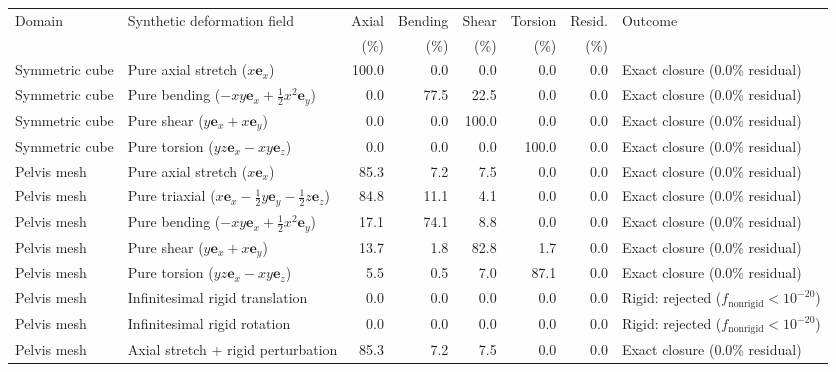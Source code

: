 \begin{tabular}{llrrrrrl}
\toprule
Domain & Synthetic deformation field & Axial & Bending & Shear & Torsion & Resid. & Outcome \\
 & & (\%) & (\%) & (\%) & (\%) & (\%) & \\
\midrule
Symmetric cube & Pure axial stretch ($x\mathbf{e}_x$) & 100.0 & 0.0 & 0.0 & 0.0 & 0.0 & Exact closure (0.0\% residual) \\
Symmetric cube & Pure bending ($-xy\mathbf{e}_x + \frac{1}{2}x^2\mathbf{e}_y$) & 0.0 & 77.5 & 22.5 & 0.0 & 0.0 & Exact closure (0.0\% residual) \\
Symmetric cube & Pure shear ($y\mathbf{e}_x + x\mathbf{e}_y$) & 0.0 & 0.0 & 100.0 & 0.0 & 0.0 & Exact closure (0.0\% residual) \\
Symmetric cube & Pure torsion ($yz\mathbf{e}_x - xy\mathbf{e}_z$) & 0.0 & 0.0 & 0.0 & 100.0 & 0.0 & Exact closure (0.0\% residual) \\
\midrule
Pelvis mesh & Pure axial stretch ($x\mathbf{e}_x$) & 85.3 & 7.2 & 7.5 & 0.0 & 0.0 & Exact closure (0.0\% residual) \\
Pelvis mesh & Pure triaxial ($x\mathbf{e}_x - \frac{1}{2}y\mathbf{e}_y - \frac{1}{2}z\mathbf{e}_z$) & 84.8 & 11.1 & 4.1 & 0.0 & 0.0 & Exact closure (0.0\% residual) \\
Pelvis mesh & Pure bending ($-xy\mathbf{e}_x + \frac{1}{2}x^2\mathbf{e}_y$) & 17.1 & 74.1 & 8.8 & 0.0 & 0.0 & Exact closure (0.0\% residual) \\
Pelvis mesh & Pure shear ($y\mathbf{e}_x + x\mathbf{e}_y$) & 13.7 & 1.8 & 82.8 & 1.7 & 0.0 & Exact closure (0.0\% residual) \\
Pelvis mesh & Pure torsion ($yz\mathbf{e}_x - xy\mathbf{e}_z$) & 5.5 & 0.5 & 7.0 & 87.1 & 0.0 & Exact closure (0.0\% residual) \\
Pelvis mesh & Infinitesimal rigid translation & 0.0 & 0.0 & 0.0 & 0.0 & 0.0 & Rigid: rejected ($f_{\mathrm{nonrigid}} < 10^{-20}$) \\
Pelvis mesh & Infinitesimal rigid rotation & 0.0 & 0.0 & 0.0 & 0.0 & 0.0 & Rigid: rejected ($f_{\mathrm{nonrigid}} < 10^{-20}$) \\
Pelvis mesh & Axial stretch + rigid perturbation & 85.3 & 7.2 & 7.5 & 0.0 & 0.0 & Exact closure (0.0\% residual) \\
\bottomrule
\end{tabular}
